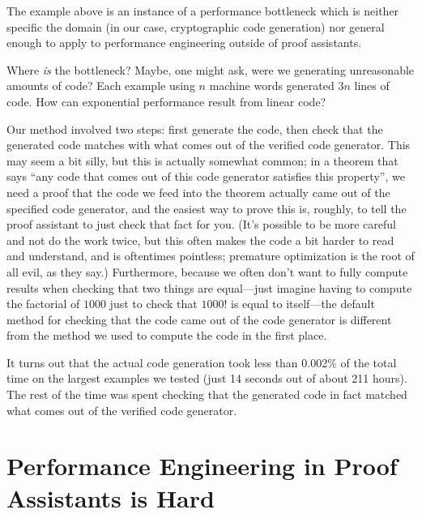 The example above is an instance of a performance bottleneck which is neither specific the domain (in our case, cryptographic code generation) nor general enough to apply to performance engineering outside of proof assistants.

Where \emph{is} the bottleneck?
Maybe, one might ask, were we generating unreasonable amounts of code?
Each example using $n$ machine words generated $3n$ lines of code.
How can exponential performance result from linear code?

Our method involved two steps: first generate the code, then check that the generated code matches with what comes out of the verified code generator.
This may seem a bit silly, but this is actually somewhat common; in a theorem that says ``any code that comes out of this code generator satisfies this property'', we need a proof that the code we feed into the theorem actually came out of the specified code generator, and the easiest way to prove this is, roughly, to tell the proof assistant to just check that fact for you.
(It's possible to be more careful and not do the work twice, but this often makes the code a bit harder to read and understand, and is oftentimes pointless; premature optimization is the root of all evil, as they say.)
Furthermore, because we often don't want to fully compute results when checking that two things are equal---just imagine having to compute the factorial of $1000$ just to check that $1000!$ is equal to itself---the default method for checking that the code came out of the code generator is different from the method we used to compute the code in the first place.

It turns out that the actual code generation took less than 0.002\% of the total time on the largest examples we tested (just 14 seconds out of about 211 hours).
The rest of the time was spent checking that the generated code in fact matched what comes out of the verified code generator.

\section{Performance Engineering in Proof Assistants is Hard}

